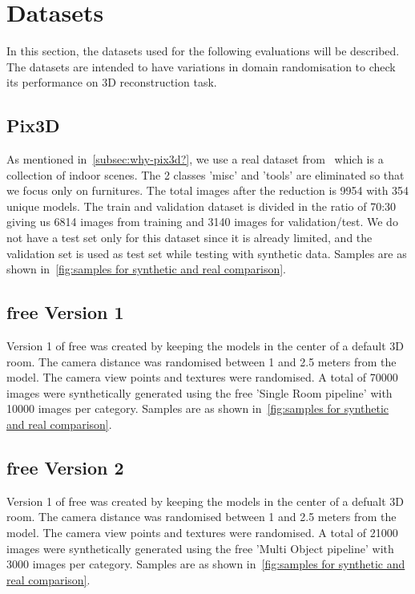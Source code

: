 \section{Datasets}\label{sec:datasets}
In this section, the datasets used for the following evaluations will be described.
The datasets are intended to have variations in domain randomisation to check its performance on 3D reconstruction task.

\subsection{Pix3D}
As mentioned in~\ref{subsec:why-pix3d?}, we use a real dataset from~\cite{pix3d} which is a collection of indoor scenes.
The 2 classes 'misc' and 'tools' are eliminated so that we focus only on furnitures.
The total images after the reduction is 9954 with 354 unique models.
The train and validation dataset is divided in the ratio of 70:30 giving us 6814 images from training and 3140 images for validation/test.
We do not have a test set only for this dataset since it is already limited, and the validation set is used as test set while testing with synthetic data.
Samples are as shown in~\ref{fig:samples for synthetic and real comparison}.

\subsection{\Gls{free} Version 1}
Version 1 of \gls{free} was created by keeping the models in the center of a default 3D room.
The camera distance was randomised between 1 and 2.5 meters from the model.
The camera view points and textures were randomised.
A total of 70000 images were synthetically generated using the \gls{free} 'Single Room pipeline' with 10000 images per category.
Samples are as shown in~\ref{fig:samples for synthetic and real comparison}.

\subsection{\Gls{free} Version 2}
Version 1 of \gls{free} was created by keeping the models in the center of a defualt 3D room.
The camera distance was randomised between 1 and 2.5 meters from the model.
The camera view points and textures were randomised.
A total of 21000 images were synthetically generated using the \gls{free} 'Multi Object pipeline' with 3000 images per category.
Samples are as shown in~\ref{fig:samples for synthetic and real comparison}.

